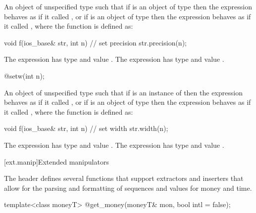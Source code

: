 \begin{itemdescr}
\pnum
\returns
An object of unspecified type such that if
is an object of type
then the expression
behaves as if it called
,
or if
is an object of type
then the expression
behaves as if it called
, where the function  is defined as:
\begin{codeblock}
void f(ios_base& str, int n) {
  // set precision
  str.precision(n);
}
\end{codeblock}

The expression
has type
and value
.
The expression
has type
and value
.
\end{itemdescr}

%
\begin{itemdecl}
@\unspec@ setw(int n);
\end{itemdecl}

\begin{itemdescr}
\pnum
\returns
An object of unspecified type such that if
is an instance of
then the expression
behaves as if it called
,
or if
is an object of type
then the expression
behaves as if it called
, where the function  is defined as:
\begin{codeblock}
void f(ios_base& str, int n) {
  // set width
  str.width(n);
}
\end{codeblock}

The expression
has type
and value
.
The expression
has type
and value
.
\end{itemdescr}

[ext.manip]{Extended manipulators}

\pnum
The header  defines several functions that support extractors and inserters that allow for the
parsing and formatting of sequences and values for money and time.

%
\begin{itemdecl}
template<class moneyT> @\unspec@ get_money(moneyT& mon, bool intl = false);
\end{itemdecl}


